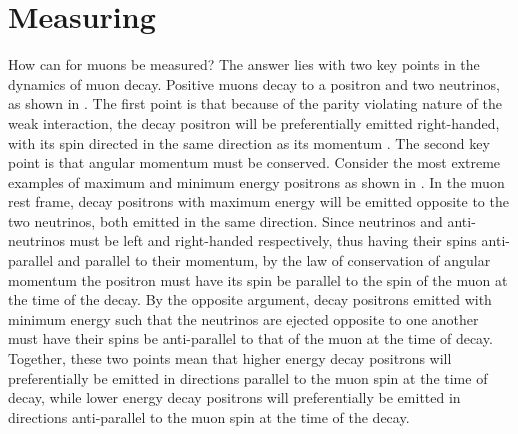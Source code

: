 





\section{Measuring \texorpdfstring{\wa}{wa}}
\label{section:WaIntro}

How can \wa for muons be measured? The answer lies with two key points in the dynamics of muon decay. Positive muons decay to a positron and two neutrinos, as shown in . The first point is that because of the parity violating nature of the weak interaction, the decay positron will be preferentially emitted right-handed, with its spin directed in the same direction as its momentum \cite{Bucksbaum}. The second key point is that angular momentum must be conserved. Consider the most extreme examples of maximum and minimum energy positrons as shown in . In the muon rest frame, decay positrons with maximum energy will be emitted opposite to the two neutrinos, both emitted in the same direction. Since neutrinos and anti-neutrinos must be left and right-handed respectively, thus having their spins anti-parallel and parallel to their momentum, by the law of conservation of angular momentum the positron must have its spin be parallel to the spin of the muon at the time of the decay. By the opposite argument, decay positrons emitted with minimum energy such that the neutrinos are ejected opposite to one another must have their spins be anti-parallel to that of the muon at the time of decay. Together, these two points mean that higher energy decay positrons will preferentially be emitted in directions parallel to the muon spin at the time of decay, while lower energy decay positrons will preferentially be emitted in directions anti-parallel to the muon spin at the time of the decay. 

